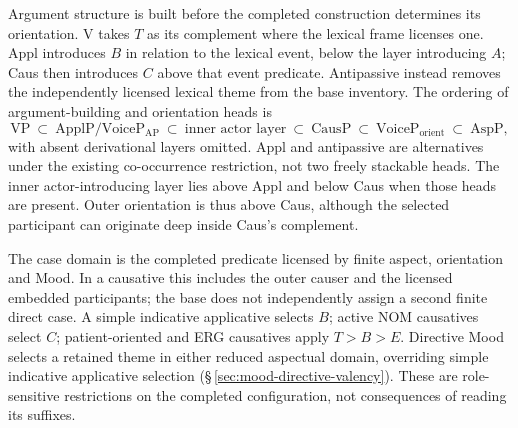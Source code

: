 Argument structure is built before the completed construction determines its
orientation. V takes $T$ as its complement where the lexical frame licenses
one. Appl introduces $B$ in relation to the lexical event, below the layer
introducing $A$; Caus then introduces $C$ above that event predicate.
Antipassive instead removes the independently licensed lexical theme from the
base inventory. The ordering of argument-building and orientation heads is
\[
 \mathrm{VP}\ \subset\ \mathrm{ApplP}/\mathrm{VoiceP}_{\mathrm{AP}}
 \ \subset\ \text{inner actor layer}\ \subset\ \mathrm{CausP}\ \subset\
 \mathrm{VoiceP}_{\mathrm{orient}}\ \subset\ \mathrm{AspP},
\]
with absent derivational layers omitted. Appl and antipassive are alternatives
under the existing co-occurrence restriction, not two freely stackable heads.
The inner actor-introducing layer lies above Appl and below Caus when those
heads are present. Outer orientation is thus above Caus, although the selected
participant can originate deep inside Caus's complement.

The case domain is the completed predicate licensed by finite aspect,
orientation and Mood. In a causative this includes the outer causer and the
licensed embedded participants; the base does not independently assign a
second finite direct case. A simple indicative applicative selects $B$;
active NOM causatives select $C$; patient-oriented and ERG causatives apply
$T>B>E$. Directive Mood selects a retained theme in either reduced aspectual
domain, overriding simple indicative applicative selection
(§\,\ref{sec:mood-directive-valency}). These are role-sensitive restrictions
on the completed configuration, not consequences of reading its suffixes.

